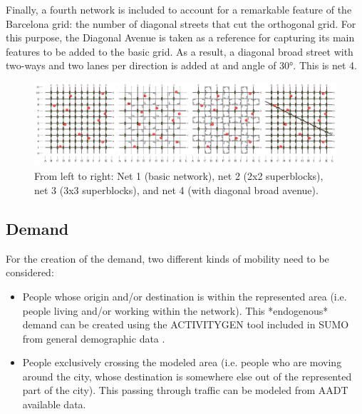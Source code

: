 \documentclass[11pt]{article}
\begin{document}
Finally, a fourth network is included to account for a remarkable feature of the Barcelona grid: the number of diagonal streets that cut the orthogonal grid. For this purpose, the Diagonal Avenue is taken as a reference for capturing its main features to be added to the basic grid. As a result, a diagonal broad street with two-ways and two lanes per direction is added at and angle of 30°. This is net 4.

\begin{figure}[htbp]
\centering
\includegraphics[scale=0.35]{bcn_paradox_4nets.PNG}
\caption{From left to right: Net 1 (basic network), net 2 (2x2 superblocks), net 3 (3x3 superblocks), and net 4 (with diagonal broad avenue).}
\label{fig:From left to right: Net 1 (basic network), net 2 (2x2 superblocks), net 3 (3x3 superblocks), and net 4 (with diagonal broad avenue).}
\end{figure}


\begin{table}[htbp]
\centering
\caption{Main metrics for each network.}
\label{tab:Nets-features}
\end{table}

\subsection {Demand}

For the creation of the demand, two different kinds of mobility need to be considered:
\begin{itemize}
    \item People whose origin and/or destination is within the represented area (i.e. people living and/or working within the network). This *endogenous* demand can be created using the ACTIVITYGEN tool included in SUMO from general demographic data \citep{Lopez2018}.
    \item People exclusively crossing the modeled area (i.e. people who are moving around the city, whose destination is somewhere else out of the represented part of the city). This passing through traffic can be modeled from AADT available data.
\end{itemize}
\end{document}
